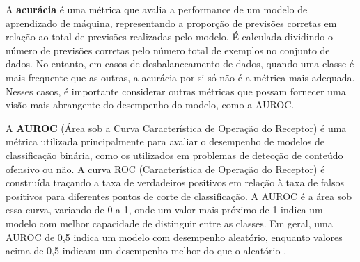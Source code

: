


A \textbf{acurácia} é uma métrica que avalia a performance de um modelo de aprendizado de máquina, representando a proporção de previsões corretas em relação ao total de previsões realizadas pelo modelo. É calculada dividindo o número de previsões corretas pelo número total de exemplos no conjunto de dados. No entanto, em casos de desbalanceamento de dados, quando uma classe é mais frequente que as outras, a acurácia por si só não é a métrica mais adequada. Nesses casos, é importante considerar outras métricas que possam fornecer uma visão mais abrangente do desempenho do modelo, como a AUROC.


A \textbf{AUROC} (Área sob a Curva Característica de Operação do Receptor) é uma métrica utilizada principalmente para avaliar o desempenho de modelos de classificação binária, como os utilizados em problemas de detecção de conteúdo ofensivo ou não. A curva ROC (Característica de Operação do Receptor) é construída traçando a taxa de verdadeiros positivos em relação à taxa de falsos positivos para diferentes pontos de corte de classificação. A AUROC é a área sob essa curva, variando de 0 a 1, onde um valor mais próximo de 1 indica um modelo com melhor capacidade de distinguir entre as classes. Em geral, uma AUROC de 0,5 indica um modelo com desempenho aleatório, enquanto valores acima de 0,5 indicam um desempenho melhor do que o aleatório \cite{BradleyAUROC}.

